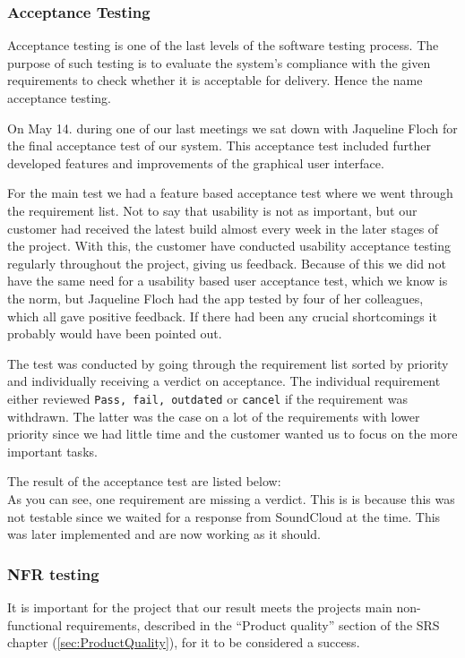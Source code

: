 \subsubsection{Acceptance Testing}

Acceptance testing is one of the last levels of the software testing process. The purpose of such testing is to evaluate the system's compliance with the given requirements to check whether it is acceptable for delivery. Hence the name acceptance testing.

On May 14. during one of our last meetings we sat down with Jaqueline Floch for the final acceptance test of our system. This acceptance test included further developed features and improvements of the graphical user interface.

For the main test we had a feature based acceptance test where we went through the requirement list. Not to say that usability is not as important, but our customer had received the latest build almost every week in the later stages of the project. With this, the customer have conducted usability acceptance testing regularly throughout the project, giving us feedback. Because of this we did not have the same need for a usability based user acceptance test, which we know is the norm, but Jaqueline Floch had the app tested by four of her colleagues, which all gave positive feedback. If there had been any crucial shortcomings it probably would have been pointed out.

The test was conducted by going through the requirement list sorted by priority and individually receiving a verdict on acceptance. The individual requirement either reviewed \texttt{Pass, fail, outdated} or \texttt{cancel} if the requirement was withdrawn. The latter was the case on a lot of the requirements with lower priority since we had little time and the customer wanted us to focus on the more important tasks.

The result of the acceptance test are listed below:\\


\label{sec:featList}
As you can see, one requirement are missing a verdict. This is is because this was not testable since we waited for a response from SoundCloud at the time. This was later implemented and are now working as it should.


\subsubsection{NFR testing}
It is important for the project that our result meets the projects main non-functional requirements, described in the ``Product quality'' section of the SRS chapter (\ref{sec:ProductQuality}), for it to be considered a success. 

